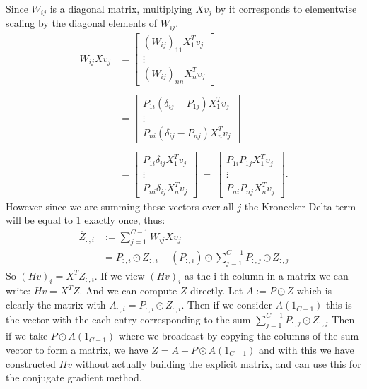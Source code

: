\documentclass[12pt]{article}
\begin{document}
Since $W_{ij}$ is a diagonal matrix, multiplying $Xv_j$ by it corresponds to
elementwise scaling by the diagonal elements of $W_{ij}$.
\begin{align*}
    W_{ij}Xv_j &= \begin{bmatrix}
        (W_{ij})_{11}X_1^Tv_j \\ \vdots \\(W_{ij})_{nn} X_n^Tv_j
    \end{bmatrix}
    \\ \\
    &= \begin{bmatrix}
        P_{1i}(\delta_{ij} - P_{1j})X_1^Tv_j \\ \vdots \\P_{ni}(\delta_{ij} - P_{nj})X_n^Tv_j
    \end{bmatrix}
    \\ \\
    &= \begin{bmatrix}
        P_{1i}\delta_{ij}X_1^Tv_j \\ \vdots \\P_{ni}\delta_{ij}X_n^Tv_j
    \end{bmatrix} \; - \;
    \begin{bmatrix}
        P_{1i}P_{1j}X_1^Tv_j \\ \vdots \\P_{ni}P_{nj}X_n^Tv_j
    \end{bmatrix}.
\end{align*}
However since we are summing these vectors over all $j$ the Kronecker Delta
term will be equal to 1 exactly once, thus:
\begin{align*}
    \overline{Z}_{:, i} &:= \displaystyle \sum_{j = 1}^{C-1} W_{ij}Xv_j \\
    &= P_{:, i} \odot Z_{:, i} - (P_{:, i}) \odot \sum_{j=1}^{C - 1}P_{:, j} \odot Z_{:, j}
\end{align*}
So $(Hv)_i = X^TZ_{:, i}$. If we view $(Hv)_i$ as the i-th column in a matrix we can write:
$Hv = X^TZ$. And we can compute $Z$ directly. Let $A := P \odot Z$ which is clearly the matrix
with $A_{:, i} = P_{:, i} \odot Z_{:, i}$. Then if we consider $A(1_{C-1})$ this
is the vector with the each entry corresponding to the sum $\displaystyle \sum_{j=1}^{C - 1}P_{:, j} \odot Z_{:, j}$
Then if we take $P \odot A(1_{C-1})$ where we broadcast by copying the columns of the sum vector
to form a matrix, we have $\overline{Z} = A - P \odot A(1_{C-1})$ and with this we have 
constructed $Hv$ without actually building the explicit matrix, and can use this
for the conjugate gradient method.
\end{document}
